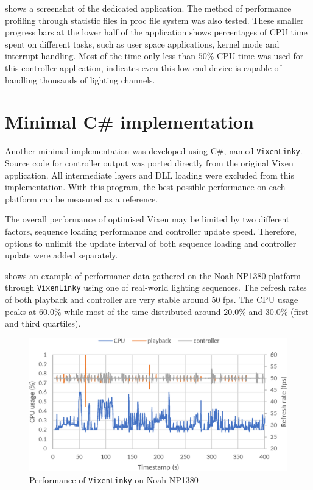  shows a screenshot of the dedicated application. The method of performance profiling through statistic files in proc file system was also tested. These smaller progress bars at the lower half of the application shows percentages of CPU time spent on different tasks, such as user space applications, kernel mode and interrupt handling. Most of the time only less than $50 \%$ CPU time was used for this controller application, indicates even this low-end device is capable of handling thousands of lighting channels.

\section{Minimal C\# implementation}

Another minimal implementation was developed using C\#, named \texttt{VixenLinky}. Source code for controller output was ported directly from the original Vixen application. All intermediate layers and DLL loading were excluded from this implementation. With this program, the best possible performance on each platform can be measured as a reference.

The overall performance of optimised Vixen may be limited by two different factors, sequence loading performance and controller update speed. Therefore, options to unlimit the update interval of both sequence loading and controller update were added separately.

 shows an example of performance data gathered on the Noah NP1380 platform through \texttt{VixenLinky} using one of real-world lighting sequences. The refresh rates of both playback and controller are very stable around 50 fps. The CPU usage peaks at $60.0 \%$ while most of the time distributed around $20.0 \%$ and $30.0 \%$ (first and third quartiles).

\begin{figure}[!t]
  \centering
  \includegraphics[width=0.8\columnwidth]{Figs/vixenlinky_noah.eps}
  \caption{\footnotesize Performance of \texttt{VixenLinky} on Noah NP1380}
  \label{fig:vixenlinky_noah}
\end{figure}
